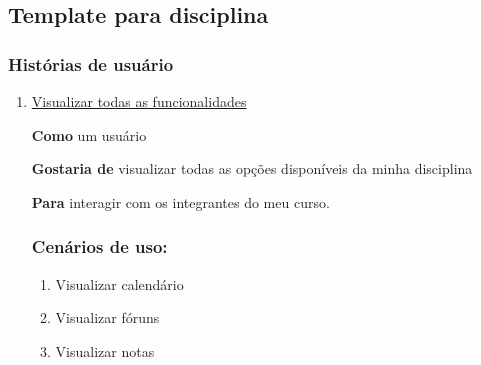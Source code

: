 \subsection{Template para disciplina}

\subsubsection*{Histórias de usuário}
\begin{enumerate}
\item \underline{Visualizar todas as funcionalidades}

\textbf{Como} um usuário

\textbf{Gostaria de} visualizar todas as opções disponíveis da minha disciplina

\textbf{Para} interagir com os integrantes do meu curso.

\subsubsection*{Cenários de uso:}
\begin{enumerate}
\item Visualizar calendário
\item Visualizar fóruns
\item Visualizar notas

\end{enumerate}
\end{enumerate}

